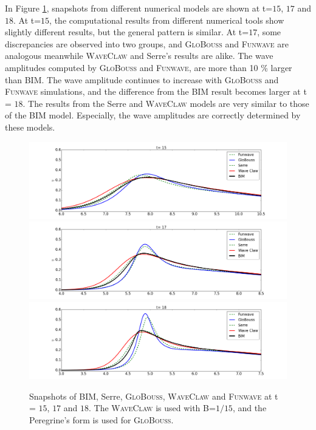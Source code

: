 \documentclass[review]{elsarticle}
\begin{document}
In Figure \ref{fig:bim_dgeo_fun}, snapshots from different
numerical models are shown at t=$15$, $17$ and $18$. 
At t=$15$, the computational results
from different numerical tools show slightly different results,
but the general pattern is similar.
At t=$17$, some discrepancies are observed into two groups, and
\textsc{GloBouss} and \textsc{Funwave} 
are analogous meanwhile \textsc{WaveClaw}
and Serre's results are alike. 
The wave amplitudes computed by \textsc{GloBouss} and \textsc{Funwave},
are more than 10 \% larger than BIM.
The wave amplitude continues to increase 
with \textsc{GloBouss} and \textsc{Funwave} simulations,
and the difference from the BIM result becomes larger at t = $18$. 
The results from the Serre and \textsc{WaveClaw} models are 
very similar to those of the BIM model. 
Especially, the wave amplitudes are correctly determined by these models.

\begin{figure}[!htb]
\centering
\includegraphics[width=.9\textwidth]{_fig/bim_dgeo_fun_glob_150.png}\\
\includegraphics[width=.9\textwidth]{_fig/bim_dgeo_fun_glob_170.png}\\
\includegraphics[width=.9\textwidth]{_fig/bim_dgeo_fun_glob_180.png}
\caption{Snapshots of BIM, Serre, \textsc{GloBouss}, \textsc{WaveClaw}
and \textsc{Funwave} at t = $15$, $17$ and $18$.
The \textsc{WaveClaw} is used with B=$1/15$,
and the Peregrine's form is used for \textsc{GloBouss}.}
\label{fig:bim_dgeo_fun}
\end{figure}
\end{document}

